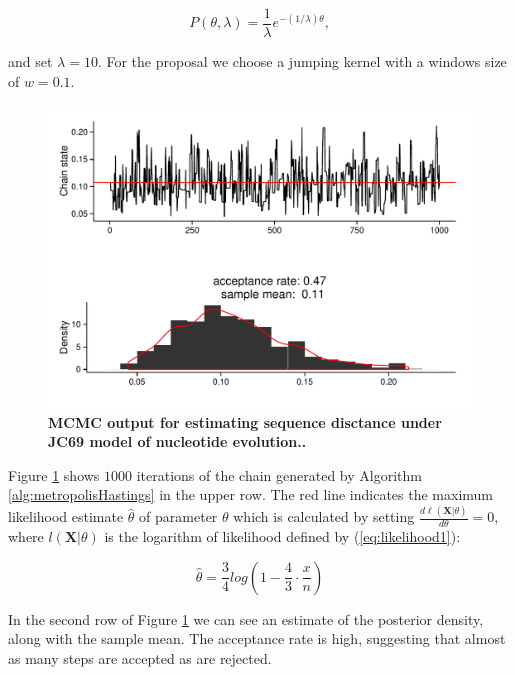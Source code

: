 \documentclass[12pt,twoside]{mitthesis}
\theoremstyle{plain}
\theoremstyle{definition}
\theoremstyle{remark}
\begin{document}
\begin{equation}
P\left(\theta,\lambda\right)=\frac{1}{\lambda}e^{-(1/\lambda)\theta},
\label{eq:expPrior}
\end{equation}

\noindent
and set $\lambda=10$.
For the proposal we choose a jumping kernel with a windows size of $w=0.1$.

\begin{figure}[H]
\begin{center}
\includegraphics[scale=0.5]{metropolis} 
\end{center}
\caption{{ \footnotesize {\bf MCMC output for estimating sequence disctance under JC69 model of nucleotide evolution..} 
}}
\label{fig:metropolis}
\end{figure}

Figure \ref{fig:metropolis} shows $1000$ iterations of the chain generated by Algorithm \ref{alg:metropolisHastings} in the upper row.
The red line indicates the maximum likelihood estimate $\hat{\theta}$ of parameter $\theta$ which is calculated by setting $\frac{d\ell\left(\mathbf{X}|\theta\right)}{d\theta}=0$, where $l\left(\mathbf{X}|\theta\right)$ is the logarithm of likelihood defined by (\ref{eq:likelihood1}):

\begin{equation}
\hat{\theta}=\frac{3}{4}log\left(1-\frac{4}{3}\cdot\frac{x}{n}\right)
\label{eq:mle}
\end{equation}

In the second row of Figure \ref{fig:metropolis} we can see an estimate of the posterior density, along with the sample mean.
The acceptance rate is high, suggesting that almost as many steps are accepted as are rejected.
\end{document}
